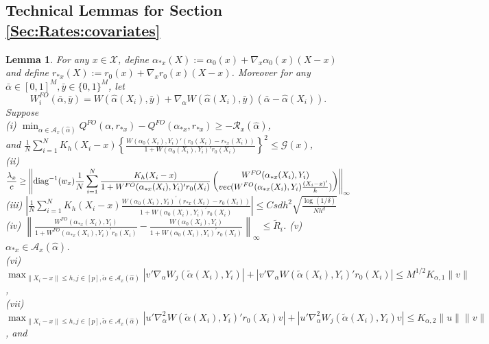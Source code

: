 \documentclass[11pt]{article}
\newtheorem{lemma}{Lemma}
\begin{document}
\subsection{Technical Lemmas for Section \ref{Sec:Rates:covariates}}
\begin{lemma}\label{lemma:main:FO-covariate}
For any $x\in \mathcal{X}$, define $\alpha_{*x}(X):= \alpha_0(x)+\nabla_x\alpha_0(x)(X-x)$ and define $r_{*x}(X):= r_0(x)+\nabla_xr_0(x)(X-x)$. Moreover for any $\bar \alpha \in [0,1]^M, \bar y \in \{0,1\}^M$, let 
$$W^{FO}_i(\bar \alpha,\bar{y})=W(\hat \alpha(X_i),\bar y)+\nabla_\alpha W(\hat\alpha(X_i),\bar y)(\bar \alpha-\hat\alpha(X_i)).$$ 
Suppose\\
(i) $\min_{\alpha\in\mathcal{A}_x(\hat \alpha)}Q^{FO}(\alpha,r_{*x})-Q^{FO}(\alpha_{*x},r_{*x}) \geq -\mathcal{R}_x(\hat{\alpha})$, \\
and $\displaystyle\frac{1}{N}\sum_{i=1}^NK_h(X_i-x) \left\{\frac{W(\alpha_0(X_i),Y_i)'(r_0(X_i)-r_{*x}(X_i))}{1+ W(\alpha_0(X_i),Y_i)'r_0(X_i)}\right\}^2 \leq \mathcal{G}(x)$,\\
(ii)$\displaystyle\frac{\lambda_x}{c} \geq \left\|  \mathrm{diag}^{-1}(w_x)\frac{1}{N}\sum_{i=1}^N\frac{  K_h(X_i-x) }{1+W^{FO}(\alpha_{*x}(X_i),Y_i)^\prime r_0(X_i)} \begin{pmatrix} W^{FO}(\alpha_{*x}(X_i),Y_i)\\{\rm vec}( W^{FO}(\alpha_{*x}(X_i),Y_i)\frac{(X_i-x)'}{h} )
\end{pmatrix}\right\|_\infty $\\
(iii) $\displaystyle\left|\frac{1}{N}\sum_{i=1}^N K_h(X_i-x)\frac{ W(\alpha_0(X_i),Y_i)^\prime(r_{*x}(X_i)-r_0(X_i))}{1+W(\alpha_0(X_i),Y_i)^\prime r_0(X_i)}\right|\leq Csdh^2\sqrt{\frac{\log(1/\delta)}{Nh^d}}$\\ 
(iv) $\displaystyle\left\|\frac{ W^{FO}(\alpha_{*x}(X_i),Y_i)}{1+W^{FO}(\alpha_{*x}(X_i),Y_i)^\prime r_0(X_i)}-\frac{ W(\alpha_0(X_i),Y_i)}{1+W(\alpha_0(X_i),Y_i)^\prime r_0(X_i)}\right\|_\infty \leq \widetilde{R}_{i}$. (v) $\alpha_{*x} \in \mathcal{A}_x(\hat\alpha)$. \\
(vi) $\displaystyle \max_{\|X_i-x\|\leq h, j\in [p], \tilde \alpha \in \mathcal{A}_x(\hat\alpha)}|v'\nabla_\alpha W_j(\tilde \alpha(X_i),Y_i)|  +|v'\nabla_\alpha W(\tilde \alpha(X_i),Y_i)'r_0(X_i)| \leq M^{1/2}K_{\alpha,1}\|v\|$, \\
(vii) $\displaystyle\max_{\|X_i-x\|\leq h, j \in [p], \tilde \alpha \in \mathcal{A}_x(\hat\alpha)}|u'\nabla_\alpha^2 W(\tilde\alpha(X_i),Y_i)'r_0(X_i)v|+|u'\nabla_\alpha^2 W_j(\tilde\alpha(X_i),Y_i)v|\leq K_{\alpha,2}\|u\|\|v\|$, and\\

\end{lemma}
\end{document}
